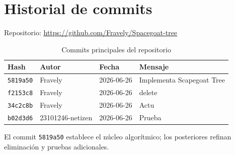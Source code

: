 \section{Historial de commits}

Repositorio: \url{https://github.com/Fravely/Spacegoat-tree}

\begin{table}[H]
  \centering
  \caption{Commits principales del repositorio}
  \begin{tabular}{@{}llll@{}}
    \toprule
    \textbf{Hash} & \textbf{Autor} & \textbf{Fecha} & \textbf{Mensaje} \\
    \midrule
    \texttt{5819a50} & Fravely & 2026-06-26 & Implementa Scapegoat Tree \\
    \texttt{f2153c8} & Fravely & 2026-06-26 & delete \\
    \texttt{34c2c8b} & Fravely & 2026-06-26 & Actu \\
    \texttt{b02d3d6} & 23101246-netizen & 2026-06-26 & Prueba \\
    \bottomrule
  \end{tabular}
\end{table}

El commit \texttt{5819a50} establece el núcleo algorítmico; los posteriores refinan eliminación y pruebas adicionales.
